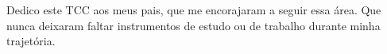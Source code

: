 \vfill
Dedico este TCC aos meus pais, que me encorajaram a seguir essa área. Que nunca deixaram faltar instrumentos de estudo ou de trabalho durante minha trajetória.



